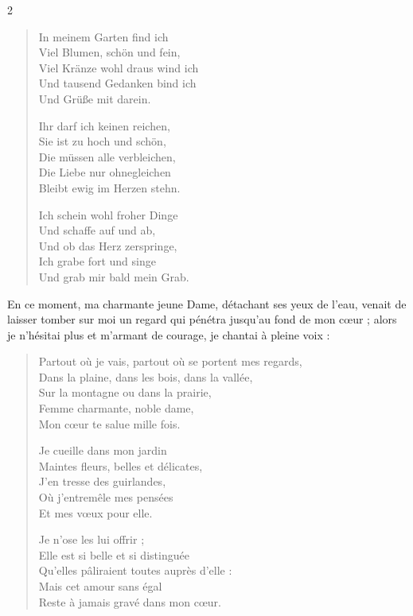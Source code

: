 \documentclass[a4paper,11pt]{article}
\begin{document}
\begin{paracol}{2}
{\begin{verse}
In meinem Garten find ich\\
Viel Blumen, schön und fein,\\
Viel Kränze wohl draus wind ich\\
Und tausend Gedanken bind ich\\
Und Grüße mit darein.

Ihr darf ich keinen reichen,\\
Sie ist zu hoch und schön,\\
Die müssen alle verbleichen,\\
Die Liebe nur ohnegleichen\\
Bleibt ewig im Herzen stehn.

Ich schein wohl froher Dinge\\
Und schaffe auf und ab,\\
Und ob das Herz zerspringe,\\
Ich grabe fort und singe\\
Und grab mir bald mein Grab.
\end{verse}}
         {En ce moment, ma charmante jeune Dame, détachant ses yeux de l’eau, venait de laisser tomber sur moi un regard qui pénétra jusqu’au fond de mon cœur ; alors je n’hésitai plus et m’armant de courage, je chantai à pleine voix :
\begin{verse}
Partout où je vais, partout où se portent mes regards,\\
Dans la plaine, dans les bois, dans la vallée,\\
Sur la montagne ou dans la prairie,\\
Femme charmante, noble dame,\\
Mon cœur te salue mille fois.

Je cueille dans mon jardin\\
Maintes fleurs, belles et délicates,\\
J’en tresse des guirlandes,\\
Où j’entremêle mes pensées\\
Et mes vœux pour elle.

Je n’ose les lui offrir ;\\
Elle est si belle et si distinguée\\
Qu’elles pâliraient toutes auprès d’elle :\\
Mais cet amour sans égal\\
Reste à jamais gravé dans mon cœur.


\end{verse}}
\end{paracol}
\end{document}
